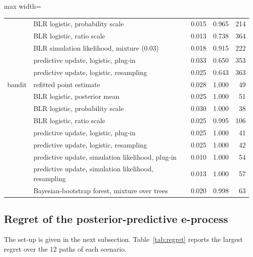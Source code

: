 \documentclass[11pt]{article}
\theoremstyle{remark}
\begin{document}
\begin{table}[t]
\begin{adjustbox}{max width=\textwidth}
\begin{tabular}{llrrr}
 & BLR logistic, probability scale & 0.015 & 0.965 & 214 \\
 & BLR logistic, ratio scale & 0.013 & 0.738 & 364 \\
 & BLR simulation likelihood, mixture (0.03) & 0.018 & 0.915 & 222 \\
 & predictive update, logistic, plug-in & 0.033 & 0.650 & 353 \\
 & predictive update, logistic, resampling & 0.025 & 0.643 & 363 \\
bandit & refitted point estimate & 0.028 & 1.000 & 49 \\
 & BLR logistic, posterior mean & 0.025 & 1.000 & 51 \\
 & BLR logistic, probability scale & 0.030 & 1.000 & 38 \\
 & BLR logistic, ratio scale & 0.025 & 0.995 & 106 \\
 & predictive update, logistic, plug-in & 0.025 & 1.000 & 41 \\
 & predictive update, logistic, resampling & 0.025 & 1.000 & 42 \\
 & predictive update, simulation likelihood, plug-in & 0.010 & 1.000 & 54 \\
 & predictive update, simulation likelihood, resampling & 0.013 & 1.000 & 57 \\
 & Bayesian-bootstrap forest, mixture over trees & 0.020 & 0.998 & 63 \\
\bottomrule
\end{tabular}
\end{adjustbox}
\end{table}


\subsection{Regret of the posterior-predictive e-process}

The set-up is given in the next subsection. Table~\ref{tab:regret}
reports the largest regret over the 12 paths of each scenario.
\end{document}
